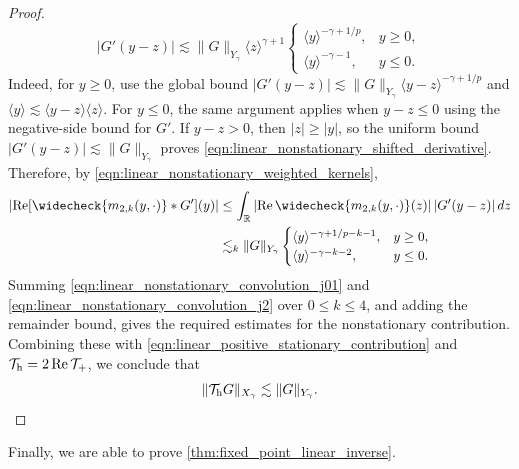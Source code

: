 \documentclass[11pt]{amsart}
\theoremstyle{definition}
\theoremstyle{remark}
\numberwithin{equation}{section}
\newcommand{\R}{\mathbb{R}}
\newcommand{\mc}[1]{\mathcal{#1}}
\newcommand{\ang}[1]{\langle #1 \rangle}
\begin{document}
\begin{proof}
    \begin{equation}\label{eqn:linear_nonstationary_shifted_derivative}
        |G'(y-z)|\lesssim\|G\|_{Y_\gamma}\ang{z}^{\gamma+1}
        \begin{cases}
            \ang{y}^{-\gamma+1/p},&y\geq0,\\
            \ang{y}^{-\gamma-1},&y\leq0.
        \end{cases}
    \end{equation}
    Indeed, for $y\geq0$, use the global bound $|G'(y-z)|\lesssim\|G\|_{Y_\gamma}\ang{y-z}^{-\gamma+1/p}$ and $\ang{y}\lesssim\ang{y-z}\ang{z}$. For $y\leq0$, the same argument applies when $y-z\leq0$ using the negative-side bound for $G'$. If $y-z>0$, then $|z|\geq|y|$, so the uniform bound $|G'(y-z)|\lesssim\|G\|_{Y_\gamma}$ proves \eqref{eqn:linear_nonstationary_shifted_derivative}. Therefore, by \eqref{eqn:linear_nonstationary_weighted_kernels},
    \begin{equation}\label{eqn:linear_nonstationary_convolution_j2}
        \begin{aligned}
            \left|\operatorname{Re}[\widecheck{m_{2,k}(y,\cdot)}*G'](y)\right|
            &\leq\int_{\R}\left|\operatorname{Re}\widecheck{m_{2,k}(y,\cdot)}(z)\right||G'(y-z)|\,dz\\
            &\lesssim_k\|G\|_{Y_\gamma}
            \begin{cases}
                \ang{y}^{-\gamma+1/p-k-1},&y\geq0,\\
                \ang{y}^{-\gamma-k-2},&y\leq0.
            \end{cases}
        \end{aligned}
    \end{equation}
    Summing \eqref{eqn:linear_nonstationary_convolution_j01} and \eqref{eqn:linear_nonstationary_convolution_j2} over $0\leq k\leq4$, and adding the remainder bound, gives the required estimates for the nonstationary contribution. Combining these with \eqref{eqn:linear_positive_stationary_contribution} and $\mc{T}_{\textup{h}}=2\operatorname{Re}\mc{T}_+$, we conclude that
    \[\|\mc{T}_{\textup{h}}G\|_{X_\gamma}\lesssim\|G\|_{Y_\gamma}.\]
\end{proof}

Finally, we are able to prove \cref{thm:fixed_point_linear_inverse}.
\end{document}
